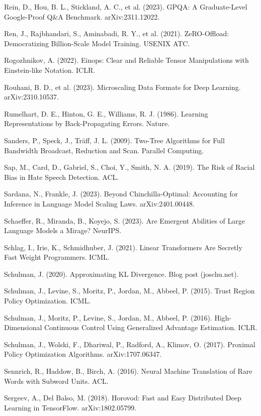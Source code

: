 {\begin{enumerate}[leftmargin=*,itemsep=1pt,label={[\arabic*]}]
\item Rein, D., Hou, B. L., Stickland, A. C., et al. (2023). GPQA: A Graduate-Level Google-Proof Q\&A Benchmark. arXiv:2311.12022.
\item Ren, J., Rajbhandari, S., Aminabadi, R. Y., et al. (2021). ZeRO-Offload: Democratizing Billion-Scale Model Training. USENIX ATC.
\item Rogozhnikov, A. (2022). Einops: Clear and Reliable Tensor Manipulations with Einstein-like Notation. ICLR.
\item Rouhani, B. D., et al. (2023). Microscaling Data Formats for Deep Learning. arXiv:2310.10537.
\item Rumelhart, D. E., Hinton, G. E., Williams, R. J. (1986). Learning Representations by Back-Propagating Errors. Nature.
\item Sanders, P., Speck, J., Träff, J. L. (2009). Two-Tree Algorithms for Full Bandwidth Broadcast, Reduction and Scan. Parallel Computing.
\item Sap, M., Card, D., Gabriel, S., Choi, Y., Smith, N. A. (2019). The Risk of Racial Bias in Hate Speech Detection. ACL.
\item Sardana, N., Frankle, J. (2023). Beyond Chinchilla-Optimal: Accounting for Inference in Language Model Scaling Laws. arXiv:2401.00448.
\item Schaeffer, R., Miranda, B., Koyejo, S. (2023). Are Emergent Abilities of Large Language Models a Mirage? NeurIPS.
\item Schlag, I., Irie, K., Schmidhuber, J. (2021). Linear Transformers Are Secretly Fast Weight Programmers. ICML.
\item Schulman, J. (2020). Approximating KL Divergence. Blog post (joschu.net).
\item Schulman, J., Levine, S., Moritz, P., Jordan, M., Abbeel, P. (2015). Trust Region Policy Optimization. ICML.
\item Schulman, J., Moritz, P., Levine, S., Jordan, M., Abbeel, P. (2016). High-Dimensional Continuous Control Using Generalized Advantage Estimation. ICLR.
\item Schulman, J., Wolski, F., Dhariwal, P., Radford, A., Klimov, O. (2017). Proximal Policy Optimization Algorithms. arXiv:1707.06347.
\item Sennrich, R., Haddow, B., Birch, A. (2016). Neural Machine Translation of Rare Words with Subword Units. ACL.
\item Sergeev, A., Del Balso, M. (2018). Horovod: Fast and Easy Distributed Deep Learning in TensorFlow. arXiv:1802.05799.

\end{enumerate}}
